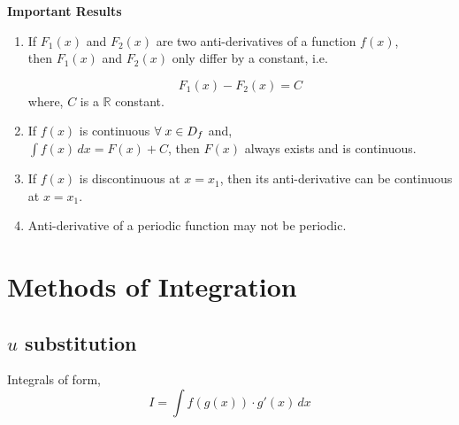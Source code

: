 \documentclass{article}
\begin{document}
\textbf{Important Results}
\begin{enumerate}
    \item If $F_{1}(x)$ and $F_{2}(x)$ are two anti-derivatives of a function $f(x)$, \\then $F_{1}(x) $ and $F_{2}(x) $ only differ by a constant, i.e. 

$$F_{1}(x) - F_{2}(x)=C$$
where, $C$ is a $\mathbb{R}$ constant.
    \item If $f(x)$ is continuous $\forall \hspace{1mm} x \in D_{f}$ and,\\
          $\displaystyle\int f(x) \, dx=F(x)+C$, then $F(x)$ always exists and is continuous.
    \item If $f(x)$ is discontinuous at $x=x_{1}$, then its anti-derivative can be continuous at $x=x_{1}$.
    \item Anti-derivative of a periodic function may not be periodic.
\end{enumerate}

\section{Methods of Integration}
\subsection{$u$ substitution}
Integrals of form, $$I=\int f(g(x))\cdot g'(x) \, dx$$
\end{document}
